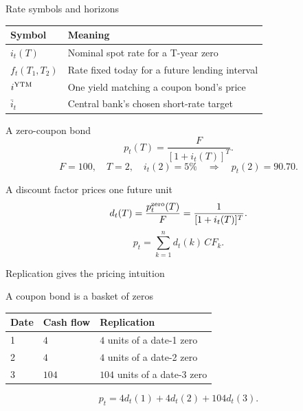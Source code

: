 \documentclass[12pt,aspectratio=169]{beamer}
\begin{document}
\begin{frame}{Rate symbols and horizons}
\begin{center}\begin{tabular}{@{}>{\raggedright\arraybackslash}p{}>{\raggedright\arraybackslash}p{}@{}}\toprule \textbf{Symbol} & \textbf{Meaning}\\\midrule $i_t(T)$ & Nominal spot rate for a T-year zero\\[2mm]
$f_t(T_1,T_2)$ & Rate fixed today for a future lending interval\\[2mm]
$i^{\rm YTM}$ & One yield matching a coupon bond’s price\\[2mm]
$\bar i_t$ & Central bank’s chosen short-rate target\\\bottomrule\end{tabular}\end{center}
\end{frame}


\begin{frame}{A zero-coupon bond}
\[p_t(T)=\frac{F}{[1+i_t(T)]^T}.\]\[F=100,\quad T=2,\quad i_t(2)=5\%\quad\Rightarrow\quad p_t(2)=90.70.\]
\end{frame}


\begin{frame}{A discount factor prices one future unit}
\[d_t(T)=\frac{p_t^{\rm zero}(T)}F=\frac1{[1+i_t(T)]^T}.\]\[p_t=\sum_{k=1}^{n}d_t(k)\,CF_k.\]
\end{frame}


\begin{frame}{Replication gives the pricing intuition}
\end{frame}


\begin{frame}{A coupon bond is a basket of zeros}
\begin{center}\begin{tabular}{@{}lll@{}}\toprule \textbf{Date} & \textbf{Cash flow} & \textbf{Replication}\\\midrule 1 & $4$ & $4$ units of a date-1 zero\\[2mm]
2 & $4$ & $4$ units of a date-2 zero\\[2mm]
3 & $104$ & $104$ units of a date-3 zero\\\bottomrule\end{tabular}\end{center}\[p_t=4d_t(1)+4d_t(2)+104d_t(3).\]
\end{frame}
\end{document}
